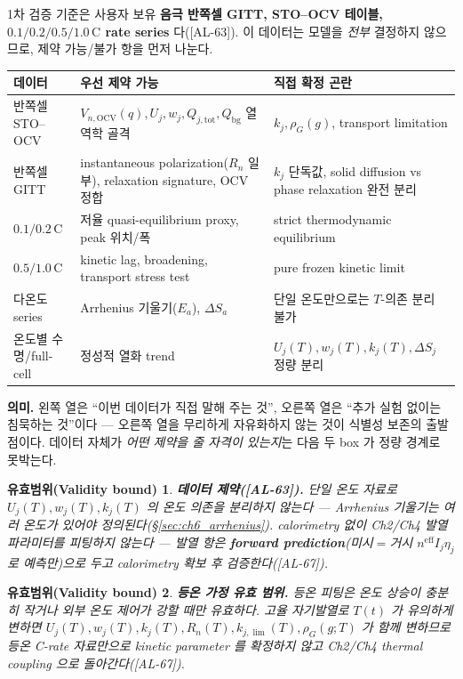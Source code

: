 \documentclass[11pt,a4paper]{article}
\newtheorem*{boundbox}{유효범위(Validity bound)}
\newcommand{\eff}{\mathrm{eff}}
\newcommand{\bg}{\mathrm{bg}}
\newcommand{\OCV}{\mathrm{OCV}}
\newcommand{\tot}{\mathrm{tot}}
\newcommand{\AL}[1]{\textsf{[AL-#1]}}
\begin{document}
1차 검증 기준은 사용자 보유 \textbf{음극 반쪽셀 GITT, STO--OCV 테이블, $0.1/0.2/0.5/1.0\,\mathrm{C}$ rate series}
다(\AL{63}). 이 데이터는 모델을 \emph{전부} 결정하지 않으므로, 제약 가능/불가 항을 먼저 나눈다.
\begin{longtable}{p{} p{} p{}}
\toprule 데이터 & 우선 제약 가능 & 직접 확정 곤란 \\ \midrule \endhead
반쪽셀 STO--OCV & $V_{n,\OCV}(q),U_j,w_j,Q_{j,\tot},Q_\bg$ 열역학 골격 & $k_j,\rho_G(g)$, transport limitation \\
반쪽셀 GITT & instantaneous polarization($R_n$ 일부), relaxation signature, OCV 정합 & $k_j$ 단독값, solid diffusion vs phase relaxation 완전 분리 \\
$0.1/0.2\,\mathrm C$ & 저율 quasi-equilibrium proxy, peak 위치/폭 & strict thermodynamic equilibrium \\
$0.5/1.0\,\mathrm C$ & kinetic lag, broadening, transport stress test & pure frozen kinetic limit \\
다온도 series & Arrhenius 기울기($E_a$), $\Delta S_a$ & 단일 온도만으로는 $T$-의존 분리 불가 \\
온도별 수명/full-cell & 정성적 열화 trend & $U_j(T),w_j(T),k_j(T),\Delta S_j$ 정량 분리 \\
\bottomrule
\end{longtable}

\textbf{의미.} 왼쪽 열은 ``이번 데이터가 직접 말해 주는 것'', 오른쪽 열은 ``추가 실험 없이는 침묵하는 것''이다 —
오른쪽 열을 무리하게 자유화하지 않는 것이 식별성 보존의 출발점이다. 데이터 자체가 \emph{어떤 제약을 줄 자격이
있는지}는 다음 두 box 가 정량 경계로 못박는다.

\begin{boundbox}
\textbf{데이터 제약(\AL{63}).} 단일 온도 자료로 $U_j(T),w_j(T),k_j(T)$ 의 온도 의존을 분리하지 않는다 — Arrhenius
기울기는 \emph{여러} 온도가 있어야 정의된다(\S\ref{sec:ch6_arrhenius}). calorimetry 없이 Ch2/Ch4 발열 파라미터를
피팅하지 않는다 — 발열 항은 \textbf{forward prediction}(미시$=$거시 $n^{\eff}I_j\eta_j$ 로 예측만)으로 두고
calorimetry 확보 후 검증한다(\AL{67}).
\end{boundbox}
\begin{boundbox}
\textbf{등온 가정 유효 범위.} 등온 피팅은 온도 상승이 충분히 작거나 외부 온도 제어가 강할 때만 유효하다. 고율
자기발열로 $T(t)$ 가 유의하게 변하면 $U_j(T),w_j(T),k_j(T),R_n(T),k_{j,\lim}(T),\rho_G(g;T)$ 가 함께 변하므로
등온 C-rate 자료만으로 kinetic parameter 를 확정하지 않고 Ch2/Ch4 thermal coupling 으로 돌아간다(\AL{67}).
\end{boundbox}
\end{document}
